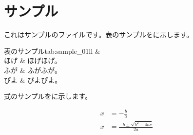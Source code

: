 \section{サンプル}

これはサンプルのファイルです。表のサンプルをに示します。

\begin{Table}{表のサンプル}{tab:sample_01}{ll}
	\hline
	 &  \\
	\hline
	ほげ & ほげほげ。 \\
	ふが & ふがふが。 \\
	ぴよ & ぴよぴよ。 \\
	\hline
\end{Table}

式のサンプルをに示します。

\begin{align}
	x &= - \frac{b}{a} \label{eq:sample} \\
	x &= \frac{-b \pm \sqrt{b^2 - 4ac}}{2a} \\
\end{align}

